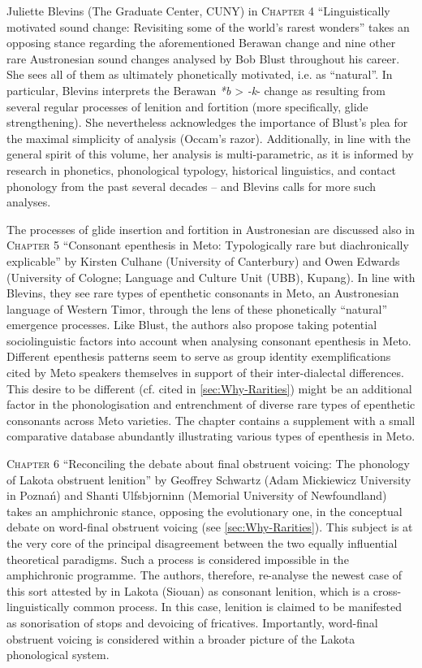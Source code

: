 \documentclass[output=paper]{langscibook}
\begin{document}
Juliette Blevins (The Graduate Center, CUNY) in \textsc{Chapter 4} “Linguistically motivated sound change: Revisiting some of the world’s rarest wonders” takes an opposing stance regarding the aforementioned Berawan change and nine other rare Austronesian sound changes analysed by Bob Blust throughout his career. She sees all of them as ultimately phonetically motivated, i.e. as “natural”. In particular, Blevins interprets the Berawan \textit{*b} > \textit{-k}{}- change as resulting from several regular processes of lenition and fortition (more specifically, glide strengthening). She nevertheless acknowledges the importance of Blust’s plea for the maximal simplicity of analysis (Occam’s razor). Additionally, in line with the general spirit of this volume, her analysis is multi-parametric, as it is informed by research in phonetics, phonological typology, historical linguistics, and contact phonology from the past several decades – and Blevins calls for more such analyses.

\begin{sloppypar}
The processes of glide insertion and fortition in Austronesian are discussed also in \textsc{Chapter 5} “Consonant epenthesis in Meto: Typologically rare but diachronically explicable” by Kirsten Culhane (University of Canterbury) and Owen Edwards (University of Cologne; Language and Culture Unit (UBB), Kupang). In line with Blevins, they see rare types of epenthetic consonants in Meto, an Austronesian language of Western Timor, through the lens of these phonetically “natural” emergence processes. Like Blust, the authors also propose taking potential sociolinguistic factors into account when analysing consonant epenthesis in Meto. Different epenthesis patterns seem to serve as group identity exemplifications cited by Meto speakers themselves in support of their inter-dialectal differences. This desire to be different (cf. \citealt{BirdKell2017} cited in \cref{sec:Why-Rarities}) might be an additional factor in the phonologisation and entrenchment of diverse rare types of epenthetic consonants across Meto varieties. The chapter contains a supplement with a small comparative database abundantly illustrating various types of epenthesis in Meto.
\end{sloppypar}

\textsc{Chapter 6} “Reconciling the debate about final obstruent voicing: The phonology of Lakota obstruent lenition” by Geoffrey Schwartz (Adam Mickiewicz University in Poznań) and Shanti Ulfsbjorninn (Memorial University of Newfoundland) takes an amphichronic stance, opposing the evolutionary one, in the conceptual debate on word-final obstruent voicing (see \cref{sec:Why-Rarities}). This subject is at the very core of the principal disagreement between the two equally influential theoretical paradigms. Such a process is considered impossible in the amphichronic programme. The authors, therefore, re-analyse the newest case of this sort attested by \citet{EgurtzegiUllrich2020} in Lakota (Siouan) as consonant lenition, which is a cross-linguistically common process. In this case, lenition is claimed to be manifested as sonorisation of stops and devoicing of fricatives. Importantly, word-final obstruent voicing is considered within a broader picture of the Lakota phonological system.
\end{document}
